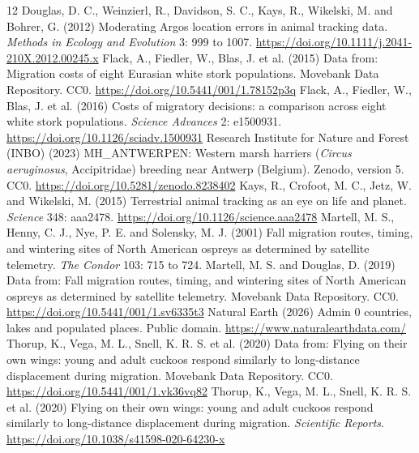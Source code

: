 \documentclass[11pt,a4paper]{article}
\begin{document}
\begin{thebibliography}{12}
 Douglas, D. C., Weinzierl, R., Davidson, S. C., Kays, R., Wikelski, M. and Bohrer, G. (2012) Moderating Argos location errors in animal tracking data. \textit{Methods in Ecology and Evolution} 3: 999 to 1007. \url{https://doi.org/10.1111/j.2041-210X.2012.00245.x}
 Flack, A., Fiedler, W., Blas, J. et al. (2015) Data from: Migration costs of eight Eurasian white stork populations. Movebank Data Repository. CC0. \url{https://doi.org/10.5441/001/1.78152p3q}
 Flack, A., Fiedler, W., Blas, J. et al. (2016) Costs of migratory decisions: a comparison across eight white stork populations. \textit{Science Advances} 2: e1500931. \url{https://doi.org/10.1126/sciadv.1500931}
 Research Institute for Nature and Forest (INBO) (2023) MH\_ANTWERPEN: Western marsh harriers (\textit{Circus aeruginosus}, Accipitridae) breeding near Antwerp (Belgium). Zenodo, version 5. CC0. \url{https://doi.org/10.5281/zenodo.8238402}
 Kays, R., Crofoot, M. C., Jetz, W. and Wikelski, M. (2015) Terrestrial animal tracking as an eye on life and planet. \textit{Science} 348: aaa2478. \url{https://doi.org/10.1126/science.aaa2478}
 Martell, M. S., Henny, C. J., Nye, P. E. and Solensky, M. J. (2001) Fall migration routes, timing, and wintering sites of North American ospreys as determined by satellite telemetry. \textit{The Condor} 103: 715 to 724.
 Martell, M. S. and Douglas, D. (2019) Data from: Fall migration routes, timing, and wintering sites of North American ospreys as determined by satellite telemetry. Movebank Data Repository. CC0. \url{https://doi.org/10.5441/001/1.sv6335t3}
 Natural Earth (2026) Admin 0 countries, lakes and populated places. Public domain. \url{https://www.naturalearthdata.com/}
 Thorup, K., Vega, M. L., Snell, K. R. S. et al. (2020) Data from: Flying on their own wings: young and adult cuckoos respond similarly to long-distance displacement during migration. Movebank Data Repository. CC0. \url{https://doi.org/10.5441/001/1.vk36vq82}
 Thorup, K., Vega, M. L., Snell, K. R. S. et al. (2020) Flying on their own wings: young and adult cuckoos respond similarly to long-distance displacement during migration. \textit{Scientific Reports}. \url{https://doi.org/10.1038/s41598-020-64230-x}
\end{thebibliography}
\end{document}
